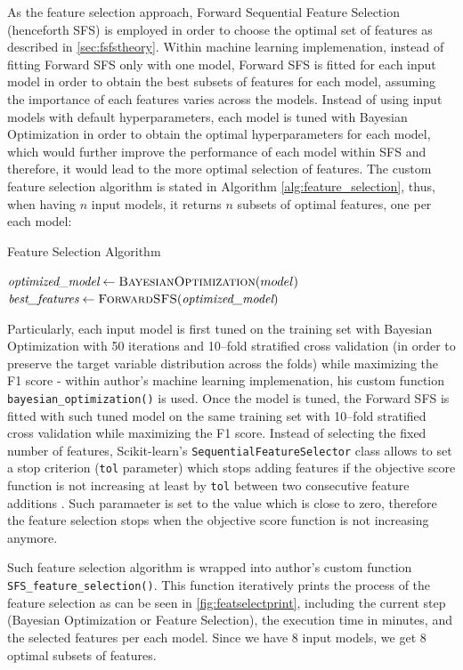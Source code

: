 As the feature selection approach, Forward Sequential Feature Selection (henceforth SFS) is employed in order to choose the optimal set of features as described in \autoref{sec:fsfstheory}.
Within machine learning implemenation, instead of fitting Forward SFS only with one model, Forward SFS is fitted for each input model in order to obtain the best subsets of features for each model, assuming the importance of each features varies across the models.
Instead of using input models with default hyperparameters, each model is tuned with Bayesian Optimization in order to obtain the optimal hyperparameters for each model, which would further improve the performance of each model within SFS and therefore, it would lead to the more optimal selection of features.
The custom feature selection algorithm is stated in Algorithm \autoref{alg:feature_selection}, thus, when having $n$ input models, it returns $n$  subsets of optimal features, one per each model:
\begin{algorithm}[H]
\caption{Feature Selection Algorithm}
\label{alg:feature_selection}
\begin{algorithmic}[1]
    \State $\textit{optimized\_model} \gets \textsc{BayesianOptimization}(model)$
    \State $\textit{best\_features} \gets \textsc{ForwardSFS}(\textit{optimized\_model})$
\EndFor
\end{algorithmic}
\end{algorithm}
Particularly, each input model is first tuned on the training set with Bayesian Optimization with 50 iterations and 10--fold stratified cross validation (in order to preserve the target variable distribution across the folds) while maximizing the F1 score - within author's machine learning implemenation, his custom function \lstinline{bayesian_optimization()} is used.
Once the model is tuned, the Forward SFS is fitted with such tuned model on the same training set with 10--fold stratified cross validation while maximizing the F1 score. Instead of selecting the fixed number of features, Scikit-learn's \lstinline{SequentialFeatureSelector} class allows to set a stop criterion (\lstinline{tol} parameter) which stops adding features if the objective score function is not increasing at least by \lstinline{tol} between two consecutive feature additions \citep{sfs}.
Such paramaeter is set to the value which is close to zero, therefore the feature selection stops when the objective score function is not increasing anymore.

Such feature selection algorithm is wrapped into author's custom function \lstinline{SFS_feature_selection()}.
This function iteratively prints the process of the feature selection as can be seen in \autoref{fig:featselectprint}, including the current step (Bayesian Optimization or Feature Selection), the execution time in minutes, and the selected features per each model. Since we have 8 input models, we get 8 optimal subsets of features.

